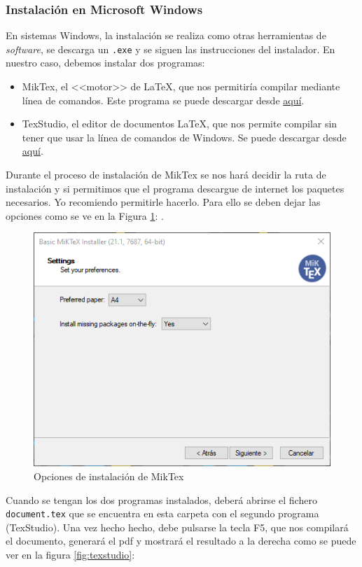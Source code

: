 \documentclass{article}
\begin{document}
\subsubsection{Instalación en Microsoft Windows}
En sistemas Windows, la instalación se realiza como otras herramientas de
\textit{software}, se descarga un \texttt{.exe} y se siguen las instrucciones
del instalador. En nuestro caso, debemos instalar dos programas:
\begin{itemize}
    \item MikTex, el <<motor>> de \LaTeX{}, que nos permitiría compilar
        mediante línea de comandos. Este programa se puede descargar desde 
        \href{https://miktex.org/download}{aquí}. 
    \item TexStudio, el editor de documentos \LaTeX{}, que nos permite compilar
        sin tener que usar la línea de comandos de Windows. Se puede descargar
        desde \href{https://www.texstudio.org/}{aquí}.
\end{itemize}
Durante el proceso de
instalación de MikTex se nos hará decidir la ruta de instalación y si permitimos
que el programa descargue de internet los paquetes necesarios. Yo
recomiendo permitirle hacerlo. Para ello se deben dejar las opciones como
se ve en la Figura \ref{fig:miktex}: .
\begin{figure}[H]
    \center
    \includegraphics[width=0.75\hsize]{miktexInstall}
    \caption{Opciones de instalación de MikTex}
    \label{fig:miktex}
\end{figure}
Cuando se tengan los dos programas instalados, deberá abrirse el fichero
\texttt{document.tex} que se encuentra en esta carpeta
con el segundo programa (TexStudio). Una vez hecho hecho, debe pulsarse la tecla
F5, que nos compilará el documento, generará el pdf y mostrará el resultado a la
derecha como se puede ver en la figura \ref{fig:texstudio}:
\end{document}
